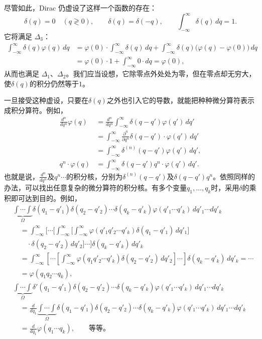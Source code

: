 \documentclass[fontsize=13pt,twoside,openany,headings=normal,parskip=false,bookmarkpackage=false,DIV=calc]{scrbook}
\begin{document}
尽管如此，Dirac 仍虚设了这样一个函数的存在：
\begin{equation}
 \delta(q)=0\quad(q\gtrless0),\qquad
 \delta(q)=\delta(-q),\qquad \int_{-\infty}^{\infty}\delta(q)\,dq=1.
 \tag{$\Delta_4$}\label{eq:I.3.D4}
\end{equation}
它将满足 \hyperref[eq:I.3.D3]{$\Delta_3$}：
\begin{align*}
 \int_{-\infty}^{\infty}\delta(q)\varphi(q)\,dq
 &=\varphi(0)\cdot\int_{-\infty}^{\infty}\delta(q)\,dq
   +\int_{-\infty}^{\infty}\delta(q)\bigl(\varphi(q)-\varphi(0)\bigr)\,dq\\
 &=\varphi(0)\cdot1+\int_{-\infty}^{\infty}0\cdot dq=\varphi(0),
\end{align*}
从而也满足 \hyperref[eq:I.3.D1]{$\Delta_1$}、\hyperref[eq:I.3.D2]{$\Delta_2$}。我们应当设想，它除零点外处处为零，但在零点却无穷大，使$\delta(q)$的积分仍然等于$1$。

一旦接受这种虚设，只要在$\delta(q)$之外也引入它的导数，就能把种种微分算符表示成积分算符。例如，
\begin{align*}
 \frac{d^n}{dq^n}\varphi(q)
 &=\frac{d^n}{dq^n}\int_{-\infty}^{\infty}\delta(q-q')\varphi(q')\,dq'\\
 &=\int_{-\infty}^{\infty}\frac{\partial^n}{\partial q^n}\delta(q-q')
    \cdot\varphi(q')\,dq'\\
 &=\int_{-\infty}^{\infty}\delta^{(n)}(q-q')\varphi(q')\,dq',\\
 q^n\cdot\varphi(q)&=\int_{-\infty}^{\infty}\delta(q-q')q^n\cdot\varphi(q')\,dq'.
\end{align*}
也就是说，$\frac{d^n}{dq^n}$及$q^n\cdots$的积分核，分别为$\delta^{(n)}(q-q')$及$\delta(q-q')q^n$。依照同样的办法，可以找出任意复杂的微分算符的积分核。有多个变量$q_1,\allowbreak \ldots,\allowbreak q_k$时，采用$\delta$的乘积即可达到目的。例如，
\begin{align*}
 &\underbrace{\int\cdots\int}_{\Omega}\delta(q_1-q'_1)\delta(q_2-q'_2)\cdots
 \delta(q_k-q'_k)\varphi(q'_1\cdots q'_k)\,dq'_1\cdots dq'_k\\
 &\quad=\int_{-\infty}^{\infty}\biggl[\cdots
 \biggl[\int_{-\infty}^{\infty}
 \biggl[\int_{-\infty}^{\infty}\varphi(q'_1q'_2\cdots q'_k)
 \delta(q_1-q'_1)\,dq'_1\biggr]\\
 &\qquad{}\cdot\delta(q_2-q'_2)\,dq'_2\biggr]\cdots\biggr]
 \delta(q_k-q'_k)\,dq'_k\\
 &\quad=\int_{-\infty}^{\infty}\left[\cdots
 \left[\int_{-\infty}^{\infty}\varphi(q_1q'_2\cdots q'_k)
 \delta(q_2-q'_2)\,dq'_2\right]\cdots\right]
 \delta(q_k-q'_k)\,dq'_k=\cdots\\
 &\quad=\varphi(q_1q_2\cdots q_k),\\[1ex]
 &\underbrace{\int\cdots\int}_{\Omega}\delta'(q_1-q'_1)\delta(q_2-q'_2)\cdots
 \delta(q_k-q'_k)\varphi(q'_1\cdots q'_k)\,dq'_1\cdots dq'_k\\
 &\quad=\frac{d}{dq_1}\underbrace{\int\cdots\int}_{\Omega}
 \delta(q_1-q'_1)\delta(q_2-q'_2)\cdots\delta(q_k-q'_k)
 \varphi(q'_1\cdots q'_k)\,dq'_1\cdots dq'_k\\
 &\quad=\frac{d}{dq_1}\varphi(q_1\cdots q_k),\qquad\text{等等。}
\end{align*}
\end{document}
